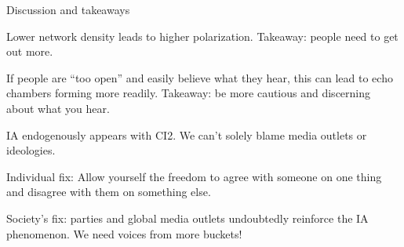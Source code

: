 \documentclass[12pt]{beamer}
\begin{document}
%


%
%
%
%

\begin{frame}[c]{Discussion and takeaways}  %

Lower network density leads to higher polarization. Takeaway: people need to
get out more.


\pause
If people are ``too open'' and easily believe what they hear, this can lead to
echo chambers forming more readily. Takeaway: be more cautious and discerning
about what you hear.

\pause
IA endogenously appears with CI2. We can't solely blame media outlets or
ideologies.

\pause
Individual fix: Allow yourself the freedom to agree with someone on one thing
and disagree with them on something else.

\pause
Society's fix: parties and global media outlets undoubtedly reinforce the IA
phenomenon. We need voices from more buckets!

\end{frame}
\end{document}
